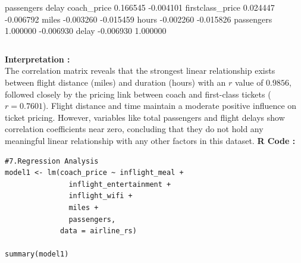 \documentclass[11pt,a4paper]{article}
\begin{document}
                  passengers     delay  
coach\_price         0.166545 -0.004101  
firstclass\_price    0.024447 -0.006792  
miles              -0.003260 -0.015459  
hours              -0.002260 -0.015826  
passengers          1.000000 -0.006930  
delay              -0.006930  1.000000

\begin{verbatim}
\end{verbatim}
\vspace{0.5em}
\noindent \textbf{Interpretation :} \\
The correlation matrix reveals that the strongest linear relationship exists between flight distance (miles) and duration (hours) with an $r$ value of $0.9856$, followed closely by the pricing link between coach and first-class tickets ($r = 0.7601$). Flight distance and time maintain a moderate positive influence on ticket pricing. However, variables like total passengers and flight delays show correlation coefficients near zero, concluding that they do not hold any meaningful linear relationship with any other factors in this dataset.
\vspace{2.5em}
\newpage
\noindent \textbf{R Code :}
\begin{codebox}
\begin{lstlisting}[style=Rstyle]
#7.Regression Analysis
model1 <- lm(coach_price ~ inflight_meal +
               inflight_entertainment +
               inflight_wifi +
               miles +
               passengers,
             data = airline_rs)

summary(model1)

\end{lstlisting}
\end{codebox}
\end{document}
